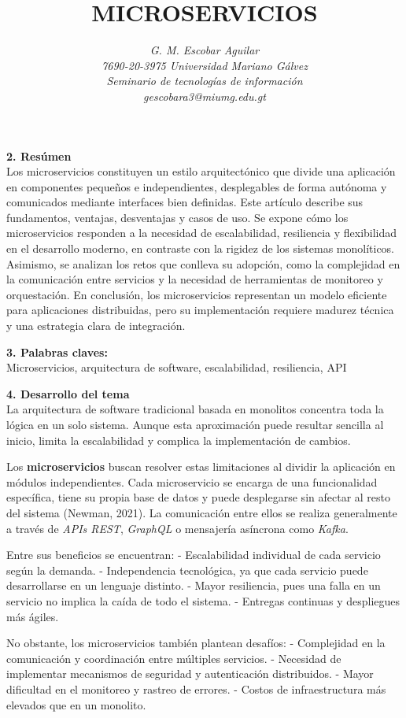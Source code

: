 \documentclass[12pt]{article}
\title{\textbf{\MakeUppercase{MICROSERVICIOS}}}
\author{\textit{G. M. Escobar Aguilar}\\
\textit{7690-20-3975 Universidad Mariano Gálvez}\\
\textit{Seminario de tecnologías de información}\\
\textit{gescobara3@miumg.edu.gt}}
\date{}
\begin{document}
\maketitle

\textbf{2. Resúmen}  
\\
Los microservicios constituyen un estilo arquitectónico que divide una aplicación en componentes pequeños e independientes, desplegables de forma autónoma y comunicados mediante interfaces bien definidas. Este artículo describe sus fundamentos, ventajas, desventajas y casos de uso. Se expone cómo los microservicios responden a la necesidad de escalabilidad, resiliencia y flexibilidad en el desarrollo moderno, en contraste con la rigidez de los sistemas monolíticos. Asimismo, se analizan los retos que conlleva su adopción, como la complejidad en la comunicación entre servicios y la necesidad de herramientas de monitoreo y orquestación. En conclusión, los microservicios representan un modelo eficiente para aplicaciones distribuidas, pero su implementación requiere madurez técnica y una estrategia clara de integración.

\textbf{3. Palabras claves:}  
\\
Microservicios, arquitectura de software, escalabilidad, resiliencia, API

\textbf{4. Desarrollo del tema}  
\\
La arquitectura de software tradicional basada en monolitos concentra toda la lógica en un solo sistema. Aunque esta aproximación puede resultar sencilla al inicio, limita la escalabilidad y complica la implementación de cambios.  

Los \textbf{microservicios} buscan resolver estas limitaciones al dividir la aplicación en módulos independientes. Cada microservicio se encarga de una funcionalidad específica, tiene su propia base de datos y puede desplegarse sin afectar al resto del sistema (Newman, 2021). La comunicación entre ellos se realiza generalmente a través de \textit{APIs REST}, \textit{GraphQL} o mensajería asíncrona como \textit{Kafka}.  

Entre sus beneficios se encuentran:  
- Escalabilidad individual de cada servicio según la demanda.  
- Independencia tecnológica, ya que cada servicio puede desarrollarse en un lenguaje distinto.  
- Mayor resiliencia, pues una falla en un servicio no implica la caída de todo el sistema.  
- Entregas continuas y despliegues más ágiles.  

No obstante, los microservicios también plantean desafíos:  
- Complejidad en la comunicación y coordinación entre múltiples servicios.  
- Necesidad de implementar mecanismos de seguridad y autenticación distribuidos.  
- Mayor dificultad en el monitoreo y rastreo de errores.  
- Costos de infraestructura más elevados que en un monolito.  
\end{document}
